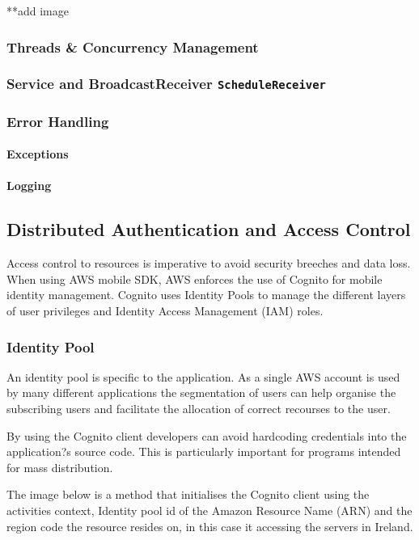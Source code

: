 \documentclass[a4paper, 11pt]{article}
\begin{document}
**add image
\subsubsection{Threads \& Concurrency Management}
\subsubsection{Service and BroadcastReceiver 
\texttt{ScheduleReceiver}
}


\subsubsection{Error Handling}
\paragraph{Exceptions}
\paragraph{Logging}


\subsection{Distributed Authentication and Access Control}

Access control to resources is imperative to avoid security breeches and data loss. When using AWS mobile SDK, AWS enforces the use of Cognito for mobile identity management. Cognito uses Identity Pools to manage the different layers of user privileges and Identity Access Management (IAM) roles.

\subsubsection{Identity Pool}
An identity pool is specific to the application. As a single AWS account is used by many different applications the segmentation of users can help organise the subscribing users and facilitate the allocation of correct recourses to the user. 

By using the Cognito client developers can avoid hardcoding credentials into the application?s source code. This is particularly important for programs intended for mass distribution. 

The image below is a method that initialises the Cognito client using the activities context, Identity pool id of the Amazon Resource Name (ARN) and the region code the resource resides on, in this case it accessing the servers in Ireland.  
\end{document}

